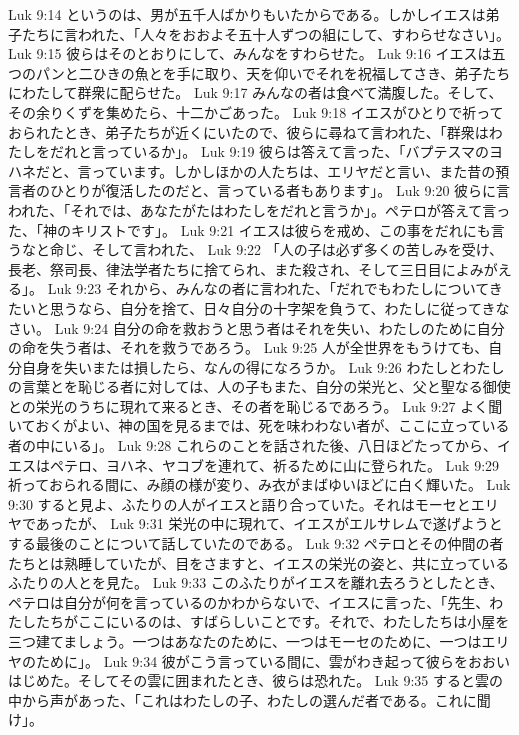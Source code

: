 Luk 9:14  というのは、男が五千人ばかりもいたからである。しかしイエスは弟子たちに言われた、「人々をおおよそ五十人ずつの組にして、すわらせなさい」。
Luk 9:15  彼らはそのとおりにして、みんなをすわらせた。
Luk 9:16  イエスは五つのパンと二ひきの魚とを手に取り、天を仰いでそれを祝福してさき、弟子たちにわたして群衆に配らせた。
Luk 9:17  みんなの者は食べて満腹した。そして、その余りくずを集めたら、十二かごあった。
Luk 9:18  イエスがひとりで祈っておられたとき、弟子たちが近くにいたので、彼らに尋ねて言われた、「群衆はわたしをだれと言っているか」。
Luk 9:19  彼らは答えて言った、「バプテスマのヨハネだと、言っています。しかしほかの人たちは、エリヤだと言い、また昔の預言者のひとりが復活したのだと、言っている者もあります」。
Luk 9:20  彼らに言われた、「それでは、あなたがたはわたしをだれと言うか」。ペテロが答えて言った、「神のキリストです」。
Luk 9:21  イエスは彼らを戒め、この事をだれにも言うなと命じ、そして言われた、
Luk 9:22  「人の子は必ず多くの苦しみを受け、長老、祭司長、律法学者たちに捨てられ、また殺され、そして三日目によみがえる」。
Luk 9:23  それから、みんなの者に言われた、「だれでもわたしについてきたいと思うなら、自分を捨て、日々自分の十字架を負うて、わたしに従ってきなさい。
Luk 9:24  自分の命を救おうと思う者はそれを失い、わたしのために自分の命を失う者は、それを救うであろう。
Luk 9:25  人が全世界をもうけても、自分自身を失いまたは損したら、なんの得になろうか。
Luk 9:26  わたしとわたしの言葉とを恥じる者に対しては、人の子もまた、自分の栄光と、父と聖なる御使との栄光のうちに現れて来るとき、その者を恥じるであろう。
Luk 9:27  よく聞いておくがよい、神の国を見るまでは、死を味わわない者が、ここに立っている者の中にいる」。
Luk 9:28  これらのことを話された後、八日ほどたってから、イエスはペテロ、ヨハネ、ヤコブを連れて、祈るために山に登られた。
Luk 9:29  祈っておられる間に、み顔の様が変り、み衣がまばゆいほどに白く輝いた。
Luk 9:30  すると見よ、ふたりの人がイエスと語り合っていた。それはモーセとエリヤであったが、
Luk 9:31  栄光の中に現れて、イエスがエルサレムで遂げようとする最後のことについて話していたのである。
Luk 9:32  ペテロとその仲間の者たちとは熟睡していたが、目をさますと、イエスの栄光の姿と、共に立っているふたりの人とを見た。
Luk 9:33  このふたりがイエスを離れ去ろうとしたとき、ペテロは自分が何を言っているのかわからないで、イエスに言った、「先生、わたしたちがここにいるのは、すばらしいことです。それで、わたしたちは小屋を三つ建てましょう。一つはあなたのために、一つはモーセのために、一つはエリヤのために」。
Luk 9:34  彼がこう言っている間に、雲がわき起って彼らをおおいはじめた。そしてその雲に囲まれたとき、彼らは恐れた。
Luk 9:35  すると雲の中から声があった、「これはわたしの子、わたしの選んだ者である。これに聞け」。
